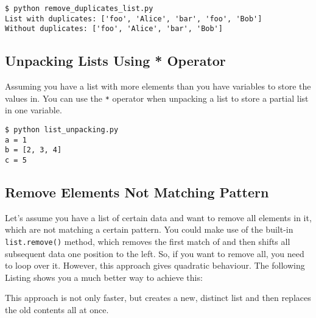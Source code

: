 

\begin{lstlisting}[caption=Output of remove\_duplicates\_list.py]
$ python remove_duplicates_list.py
List with duplicates: ['foo', 'Alice', 'bar', 'foo', 'Bob']
Without duplicates: ['foo', 'Alice', 'bar', 'Bob']
\end{lstlisting}


\subsection{Unpacking Lists Using * Operator}

Assuming you have a list with more elements than you have variables to store the values in.
You can use the \lstinline{*} operator when unpacking a list to store a partial list in one variable.



\begin{lstlisting}[caption=Output of list\_unpacking.py]
$ python list_unpacking.py
a = 1
b = [2, 3, 4]
c = 5
\end{lstlisting}


\subsection{Remove Elements Not Matching Pattern}

Let's assume you have a list of certain data and want to remove all elements in it, which are not matching a certain pattern.
You could make use of the built-in \lstinline{list.remove()} method, which removes the first match of and then shifts all subsequent data one position to the left.
So, if you want to remove all, you need to loop over it.
However, this approach gives quadratic behaviour.
The following Listing shows you a much better way to achieve this:



This approach is not only faster, but creates a new, distinct list and then replaces the old contents all at once.
